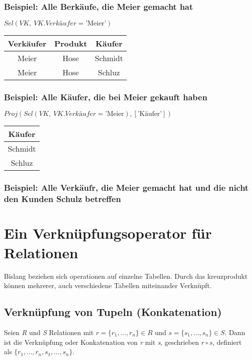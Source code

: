 \subsubsection{Beispiel: Alle Berkäufe, die Meier gemacht hat}
$Sel(VK,\ VK.Verkäufer = \text{'Meier'})$
\begin{table}[H]
    \centering
    \begin{tabular}{|c|c|c|}
        \hline
        \textbf{Verkäufer} & \textbf{Produkt} & \textbf{Käufer} \\
        \hline
        Meier & Hose & Schmidt \\
        \hline
        Meier & Hose & Schluz \\
        \hline
    \end{tabular}
\end{table}

\subsubsection{Beispiel: Alle Käufer, die bei Meier gekauft haben}
$Proj(Sel(VK,\ VK.Verkäufer = \text{'Meier}), [\text{'Käufer'}])$

\begin{table}[H]
    \centering
    \begin{tabular}{|c|}
        \hline
        \textbf{Käufer} \\
        \hline
        Schmidt \\
        \hline
        Schluz \\
        \hline
    \end{tabular}
\end{table}

\subsubsection{Beispiel: Alle Verkäufr, die Meier gemacht hat und die nicht den Kunden Schulz betreffen}

\section{Ein Verknüpfungsoperator für Relationen}
Bislang beziehen sich operationen auf einzelne Tabellen. Durch das kreuzprodukt können mehrerer, auch verschiedene Tabellen miteinander Verknüpft.

\subsection{Verknüpfung von Tupeln (Konkatenation)}
Seien \textit{R} und \textit{S} Relationen mit $r = \{r_1, \dots, r_n\} \in R$ und $s = \{s_1, \dots, s_n\} \in S$. Dann ist die Verknüpfung oder Konkatenation von \textit{r} mit \textit{s}, geschrieben $r \circ s$, definiert als $\{r_1, \dots, r_n, s_1, \dots, s_n\}$.

